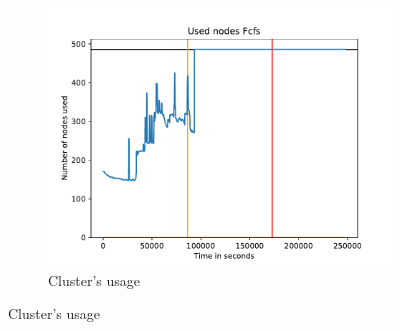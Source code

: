 \documentclass[a4paper]{article}
\begin{document}
\begin{figure}[H]\centering
\begin{subfigure}[b]{0.4\linewidth}\centering\includegraphics[width=1\linewidth]{MBSS/plot/2022-08-16->2022-08-16_V9271_Fcfs_Used_nodes_450_128_32_256_4_1024.pdf}\caption{Cluster's usage}\end{subfigure}

\end{figure}
\end{document}

